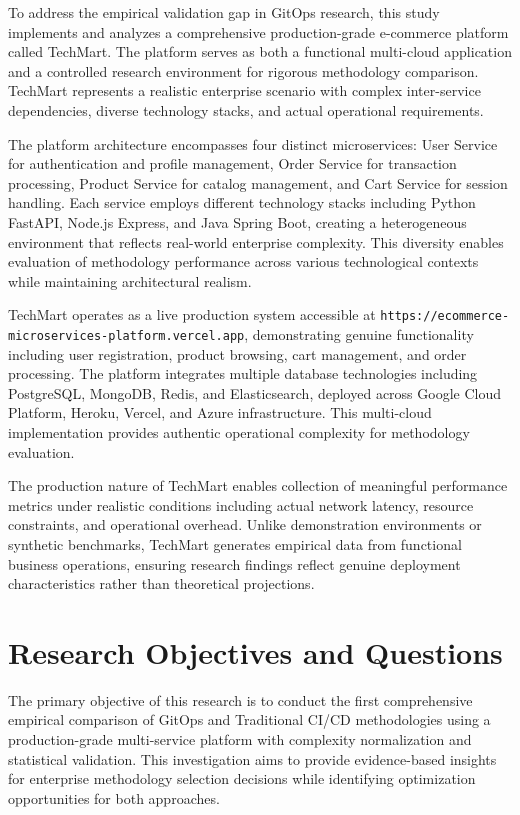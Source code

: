 To address the empirical validation gap in GitOps research, this study implements and analyzes a comprehensive production-grade e-commerce platform called TechMart. The platform serves as both a functional multi-cloud application and a controlled research environment for rigorous methodology comparison. TechMart represents a realistic enterprise scenario with complex inter-service dependencies, diverse technology stacks, and actual operational requirements.

The platform architecture encompasses four distinct microservices: User Service for authentication and profile management, Order Service for transaction processing, Product Service for catalog management, and Cart Service for session handling. Each service employs different technology stacks including Python FastAPI, Node.js Express, and Java Spring Boot, creating a heterogeneous environment that reflects real-world enterprise complexity. This diversity enables evaluation of methodology performance across various technological contexts while maintaining architectural realism.

TechMart operates as a live production system accessible at \texttt{https://ecommerce-microservices-platform.vercel.app}, demonstrating genuine functionality including user registration, product browsing, cart management, and order processing. The platform integrates multiple database technologies including PostgreSQL, MongoDB, Redis, and Elasticsearch, deployed across Google Cloud Platform, Heroku, Vercel, and Azure infrastructure. This multi-cloud implementation provides authentic operational complexity for methodology evaluation.

The production nature of TechMart enables collection of meaningful performance metrics under realistic conditions including actual network latency, resource constraints, and operational overhead. Unlike demonstration environments or synthetic benchmarks, TechMart generates empirical data from functional business operations, ensuring research findings reflect genuine deployment characteristics rather than theoretical projections.

\section{Research Objectives and Questions}

The primary objective of this research is to conduct the first comprehensive empirical comparison of GitOps and Traditional CI/CD methodologies using a production-grade multi-service platform with complexity normalization and statistical validation. This investigation aims to provide evidence-based insights for enterprise methodology selection decisions while identifying optimization opportunities for both approaches.

